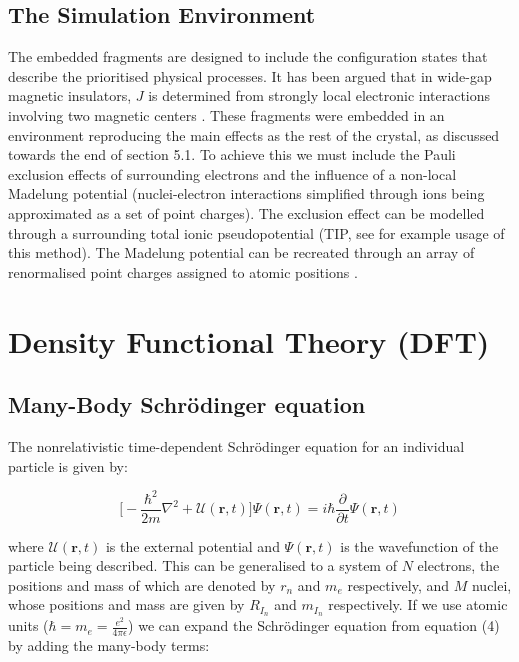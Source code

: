 \documentclass[10pt]{article}
\begin{document}
\subsection{The Simulation Environment}
The embedded fragments are designed to include the configuration states that describe the prioritised physical processes. It has been argued that in wide-gap magnetic insulators, $J$ is determined from strongly local electronic interactions involving two magnetic centers \cite{de1999local}. These fragments were embedded in an environment reproducing the main effects as the rest of the crystal, as discussed towards the end of section 5.1. To achieve this we must include the Pauli exclusion effects of surrounding electrons and the influence of a non-local Madelung potential (nuclei-electron interactions simplified through ions being approximated as a set of point charges). The exclusion effect can be modelled through a surrounding total ionic pseudopotential (TIP, see \cite{winter1987theoretical} for example usage of this method). The Madelung potential can be recreated through an array of renormalised point charges assigned to atomic positions \cite{gelle2008fast}.

\section{Density Functional Theory (DFT)}
\subsection{Many-Body Schrödinger equation}
The nonrelativistic time-dependent Schrödinger equation for an individual particle is given by:

\begin{equation}
	\biggr[-\frac{\hbar^2}{2m}\nabla^2+\mathcal{U}(\textbf{r},t)\biggr]\Psi(\textbf{r},t) = i\hbar\frac{\partial}{\partial t}\Psi(\textbf{r},t)
\end{equation}

where $\mathcal{U}(\textbf{r},t)$ is the external potential and $\Psi(\textbf{r},t)$ is the wavefunction of the particle being described. This can be generalised to a system of $N$ electrons, the positions and mass of which are denoted by \textbf{$r_n$} and $m_e$ respectively, and $M$ nuclei, whose positions and mass are given by \textbf{$R_{I_n}$} and $m_{I_n}$ respectively. If we use atomic units ($\hbar = m_e = \frac{e^2}{4\pi\epsilon}$) we can expand the Schrödinger equation from equation (4) by adding the many-body terms:
\end{document}

